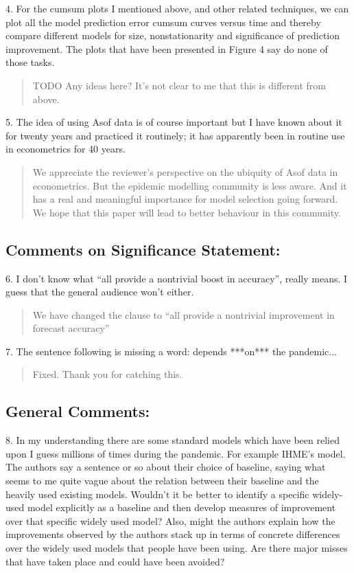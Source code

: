 \documentclass[11pt]{article}
\newenvironment{resp}{\begin{quote}\color{cobalt}}{\end{quote}}
\begin{document}
4. For the cumsum plots I mentioned above, and other related techniques, we can
plot all the model prediction error cumsum curves versus time and thereby
compare different models for size, nonstationarity and significance of
prediction improvement. The plots that have been presented in Figure 4 say do
none of those tasks.

\begin{resp}
  TODO Any ideas here? It's not clear to me that this is different from above.
\end{resp}

5. The idea of using Asof data is of course important but I have known about it
for twenty years and practiced it routinely; it has apparently been in routine
use in econometrics for 40 years.

\begin{resp}
  We appreciate the reviewer's perspective on the ubiquity of Asof data in
  econometrics. But the epidemic modelling community is less aware. And it
  has a real and meaningful importance for model selection going forward. We
  hope that this paper will lead to better behaviour in this community.
\end{resp}

\subsection*{Comments on Significance Statement:}

6. I don't know what ``all provide a nontrivial boost in accuracy'', really
means. I guess that the general audience won't either.

\begin{resp}
  We have changed the clause to ``all provide a nontrivial improvement in
  forecast accuracy''
\end{resp}

7. The sentence following is missing a word: depends ***on*** the pandemic...

\begin{resp}
  Fixed. Thank you for catching this.
\end{resp}

\subsection*{General Comments: }

8. In my understanding there are some standard models which have been relied
upon I guess millions of times during the pandemic. For example IHME's model.
The authors say a sentence or so about their choice of baseline, saying what
seems to me quite vague about the relation between their baseline and the
heavily used existing models. Wouldn't it be better to identify a specific
widely-used model explicitly as a baseline and then develop measures of
improvement over that specific widely used model? Also, might the authors
explain how the improvements observed by the authors stack up in terms of
concrete differences over the widely used models that people have been using.
Are there major misses that have taken place and could have been avoided?  
\end{document}
